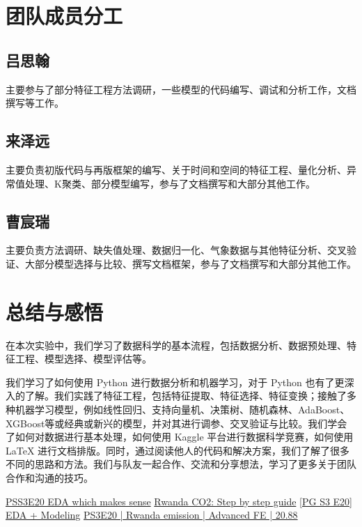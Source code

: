 \documentclass{ctexart}
\begin{document}
\begin{sloppypar}
\section{团队成员分工}

\subsection{吕思翰}

主要参与了部分特征工程方法调研，一些模型的代码编写、调试和分析工作，文档撰写等工作。

\subsection{来泽远}

主要负责初版代码与再版框架的编写、关于时间和空间的特征工程、量化分析、异常值处理、K聚类、部分模型编写，参与了文档撰写和大部分其他工作。

\subsection{曹宸瑞}

主要负责方法调研、缺失值处理、数据归一化、气象数据与其他特征分析、交叉验证、大部分模型选择与比较、撰写文档框架，参与了文档撰写和大部分其他工作。

\section{总结与感悟}

在本次实验中，我们学习了数据科学的基本流程，包括数据分析、数据预处理、特征工程、模型选择、模型评估等。

我们学习了如何使用 Python 进行数据分析和机器学习，对于 Python 也有了更深入的了解。我们实践了特征工程，包括特征提取、特征选择、特征变换；接触了多种机器学习模型，例如线性回归、支持向量机、决策树、随机森林、AdaBoost、XGBoost等或经典或新兴的模型，并对其进行调参、交叉验证与比较。我们学会了如何对数据进行基本处理，如何使用 Kaggle 平台进行数据科学竞赛，如何使用 \LaTeX{} 进行文档排版。同时，通过阅读他人的代码和解决方案，我们了解了很多不同的思路和方法。我们与队友一起合作、交流和分享想法，学习了更多关于团队合作和沟通的技巧。

\begin{thebibliography}{100}
      \href{https://www.kaggle.com/code/ambrosm/pss3e20-eda-which-makes-sense}{PSS3E20 EDA which makes sense}
      \href{https://www.kaggle.com/code/kacperrabczewski/rwanda-co2-step-by-step-guide}{Rwanda CO2: Step by step guide}
      \href{https://www.kaggle.com/code/yaaangzhou/pg-s3-e20-eda-modeling}{[PG S3 E20] EDA + Modeling}
      \href{https://www.kaggle.com/code/dmitryuarov/ps3e20-rwanda-emission-advanced-fe-20-88}{PS3E20 | Rwanda emission | Advanced FE | 20.88}
\end{thebibliography}

\end{sloppypar}
\end{document}
